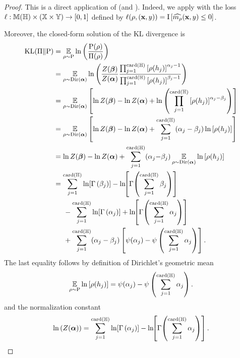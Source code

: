 \begin{noaddcontents}
\theorembound*

\begin{proof}
This is a direct application of  (and ).
Indeed, we apply  with the loss $\ell: \mathbb{M}(\mathbb{H})\times(\mathbb{X}\times\mathbb{Y}) \to [0,1]$ defined by $\ell(\rho, (\mathbf{x},y)) = \operatorname{I}\left[ \widehat{m_{\rho}}(\mathbf{x}, y) \le 0\right]$.

Moreover, the closed-form solution of the KL divergence is 
\begin{align*}
    \KL(\hyperP\|\hyperQ) &= \EE_{\Q\sim\hyperQ} \ln\LP\frac{\hyperQ(\Q)}{\hyperP(\Q)}\RP\\
    &= \EE_{\Q\sim\Dir(\paramDir)} \ln \LP \frac{Z(\paramDirP)}{Z(\paramDir)} \frac{\prod_{j=1}^{\card(\H)} \LB\Q(\h_j)\RB^{\sparamDir_j -1}}{\prod_{j=1}^{\card(\H)} \LB\Q(\h_j)\RB^{\sparamDirP_j -1}}\RP \\
    &= \EE_{\Q\sim\Dir(\paramDir)} \LB \ln Z(\paramDirP) - \ln Z(\paramDir) + \ln \LP \prod_{j=1}^{\card(\H)} \LB\Q(\h_j)\RB^{\sparamDir_j - \sparamDirP_j}\RP \RB\\
     &= \EE_{\Q\sim\Dir(\paramDir)}  \LB \ln Z(\paramDirP) - \ln Z(\paramDir) + \sum_{j=1}^{\card(\H)} (\sparamDir_j - \sparamDirP_j) \ln \LB\Q(\h_j)\RB \RB \\
     &= \ln Z(\paramDirP) - \ln Z(\paramDir) + \sum_{j=1}^{\card(\H)} (\sparamDir_j{-}\sparamDirP_j) \EE_{\Q\sim\Dir(\paramDir)} \ln \LB\Q(\h_j)\RB\\
     &= \sum_{j=1}^{\card(\H)}\ln\!\LB\Gamma\LP\sparamDirP_j\RP\RB - \ln\!\!\LB\Gamma\!\LP\sum_{j=1}^{\card(\H)}\sparamDirP_j\RP\RB\\ &\hspace{0.5cm}-\sum_{j=1}^{\card(\H)}\ln\!\LB\Gamma\LP\sparamDir_j\RP\RB + \ln\!\!\LB\Gamma\!\LP\sum_{j=1}^{\card(\H)}\sparamDir_j\RP\RB\\
     &\hspace{0.5cm}+ \sum_{j=1}^{\card(\H)} (\sparamDir_j - \sparamDirP_j) \LB\psi(\sparamDir_j) - \psi\LP\sum_{j=1}^{\card(\H)}\sparamDir_j\RP\RB.
\end{align*}
The last equality follows by definition of Dirichlet's geometric mean
\begin{align*}
\operatorname*{\mathbb{E}}_{\rho\sim\mathrm{P}} \ln \left[\rho(h_j)\right] = \psi(\alpha_j) - \psi\left(\sum_{j=1}^{\operatorname{card}(\mathbb{H})}\alpha_j\right).
\end{align*}
and the normalization constant
\begin{align*}
    \ln\left( Z(\boldsymbol{\alpha})\right) = \sum_{j=1}^{\operatorname{card}(\mathbb{H})}\ln\!\left[\Gamma\left(\alpha_j\right)\right] - \ln\!\!\left[\Gamma\!\left(\sum_{j=1}^{\operatorname{card}(\mathbb{H})}\alpha_j\right)\right].
\end{align*}
\end{proof}


\end{noaddcontents}
